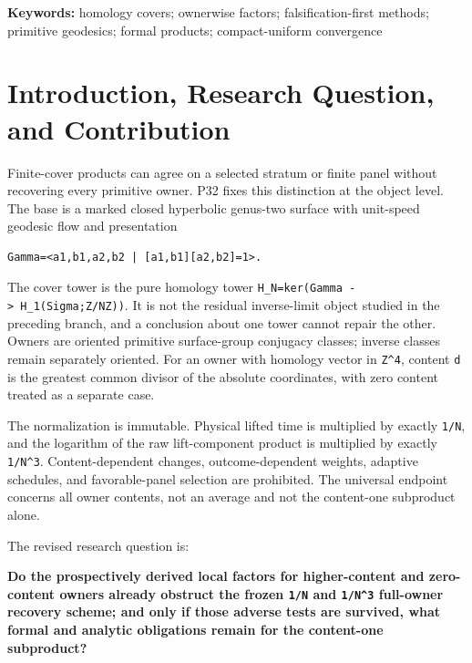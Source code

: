 \documentclass[11pt]{article}
\begin{document}
\noindent\textbf{Keywords:} homology covers; ownerwise factors;
falsification-first methods; primitive geodesics; formal products;
compact-uniform convergence

\medskip
{}

\hypertarget{1-introduction-research-question-and-contribution}{%
\section{Introduction, Research Question, and
Contribution}\label{1-introduction-research-question-and-contribution}}

Finite-cover products can agree on a selected stratum or finite panel
without recovering every primitive owner. P32 fixes this distinction at
the object level. The base is a marked closed hyperbolic genus-two
surface with unit-speed geodesic flow and presentation

\begin{verbatim}
Gamma=<a1,b1,a2,b2 | [a1,b1][a2,b2]=1>.
\end{verbatim}

The cover tower is the pure homology tower
\texttt{H\_N=ker(Gamma\ -\textgreater{}\ H\_1(Sigma;Z/NZ))}. It is not
the residual inverse-limit object studied in the preceding branch, and a
conclusion about one tower cannot repair the other. Owners are oriented
primitive surface-group conjugacy classes; inverse classes remain
separately oriented. For an owner with homology vector in
\texttt{Z\^{}4}, content \texttt{d} is the greatest common divisor of
the absolute coordinates, with zero content treated as a separate case.

The normalization is immutable. Physical lifted time is multiplied by
exactly \texttt{1/N}, and the logarithm of the raw lift-component
product is multiplied by exactly \texttt{1/N\^{}3}. Content-dependent
changes, outcome-dependent weights, adaptive schedules, and
favorable-panel selection are prohibited. The universal endpoint
concerns all owner contents, not an average and not the content-one
subproduct alone.

The revised research question is:

\textbf{Do the prospectively derived local factors for higher-content
and zero-content owners already obstruct the frozen \texttt{1/N} and
\texttt{1/N\^{}3} full-owner recovery scheme; and only if those adverse
tests are survived, what formal and analytic obligations remain for the
content-one subproduct?}
\end{document}
